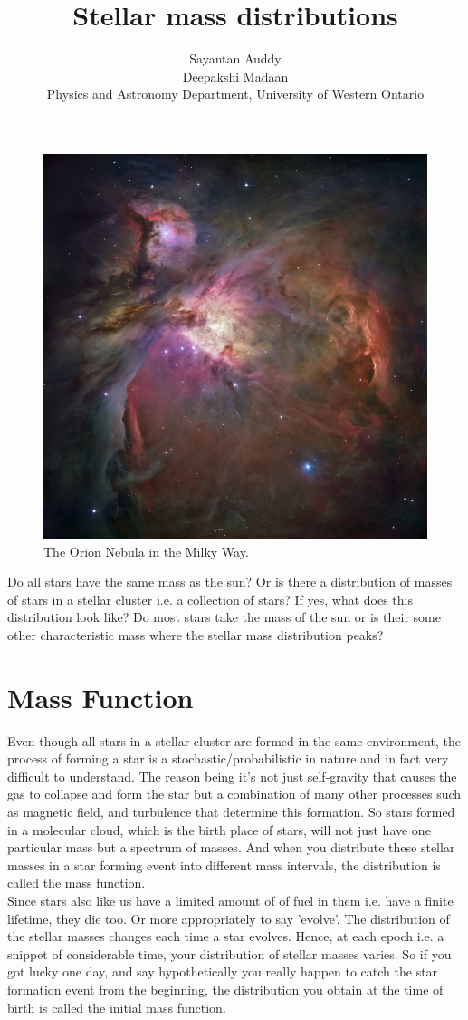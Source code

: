 \documentclass{article}
\title{\bf Stellar mass distributions}
\author{ Sayantan Auddy \\ Deepakshi Madaan \\ Physics and Astronomy Department, University of Western Ontario}
\begin{document}
    \begin{figure}
	\centering
        \includegraphics[]{ONCpic.png}
	\caption{The Orion Nebula in the Milky Way.}
  \end{figure}

\newpage

Do all stars have the same mass as the sun? Or is there a distribution of masses of stars in a stellar cluster i.e. a collection of stars? If yes, what does this distribution look like? Do most stars take the mass of the sun or is their some other characteristic mass where the stellar mass distribution peaks?    
 
\section{Mass Function}
Even though all stars in a stellar cluster are formed in the same environment, the process of forming a star is a stochastic/probabilistic in nature and in fact very difficult to understand. The reason being it's not just self-gravity that causes the gas to collapse and form the star but a combination of many other processes such as magnetic field, and turbulence that determine this formation. So stars formed in a molecular cloud, which is the birth place of stars, will not just have one particular mass but a spectrum of masses. And when you distribute these stellar masses in a star forming event into different mass intervals, the distribution is called the mass function. 
\\ Since stars also like us have a limited amount of of fuel in them i.e. have a finite lifetime, they die too. Or more appropriately to say  'evolve'.  The distribution of the stellar masses changes each time a star evolves. Hence, at each epoch i.e. a snippet of considerable time, your distribution of stellar masses varies. So if you got lucky one day, and say hypothetically you really happen to catch the star formation event from the beginning, the distribution you obtain at the time of birth is called the initial mass function. 
\end{document}

